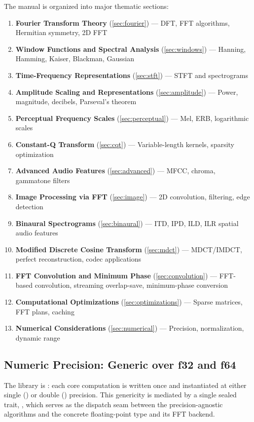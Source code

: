 The manual is organized into major thematic sections:
\begin{enumerate}[itemsep=3pt]
  \item \textbf{Fourier Transform Theory} (\cref{sec:fourier}) ---
    DFT, FFT algorithms, Hermitian symmetry, 2D FFT
  \item \textbf{Window Functions and Spectral Analysis}
    (\cref{sec:windows}) --- Hanning, Hamming, Kaiser, Blackman, Gaussian
  \item \textbf{Time-Frequency Representations} (\cref{sec:stft}) ---
    STFT and spectrograms
  \item \textbf{Amplitude Scaling and Representations} (\cref{sec:amplitude})
    --- Power, magnitude, decibels, Parseval's theorem
  \item \textbf{Perceptual Frequency Scales} (\cref{sec:perceptual})
    --- Mel, ERB, logarithmic scales
  \item \textbf{Constant-Q Transform} (\cref{sec:cqt}) --- Variable-length
    kernels, sparsity optimization
  \item \textbf{Advanced Audio Features} (\cref{sec:advanced}) ---
    MFCC, chroma, gammatone filters
  \item \textbf{Image Processing via FFT} (\cref{sec:image}) --- 2D
    convolution, filtering, edge detection
  \item \textbf{Binaural Spectrograms} (\cref{sec:binaural}) ---
    ITD, IPD, ILD, ILR spatial audio features
  \item \textbf{Modified Discrete Cosine Transform} (\cref{sec:mdct}) ---
    MDCT/IMDCT, perfect reconstruction, codec applications
  \item \textbf{FFT Convolution and Minimum Phase} (\cref{sec:convolution}) ---
    FFT-based convolution, streaming overlap-save, minimum-phase conversion
  \item \textbf{Computational Optimizations}
    (\cref{sec:optimizations}) --- Sparse matrices, FFT plans, caching
  \item \textbf{Numerical Considerations} (\cref{sec:numerical}) ---
    Precision, normalization, dynamic range
\end{enumerate}

\subsection{Numeric Precision: Generic over f32 and f64}\label{subsec:precision}

The library is : each core computation is
written once and instantiated at either single () or double
() precision. This genericity is mediated by a single sealed
trait, , which serves as the dispatch seam between the
precision-agnostic algorithms and the concrete floating-point type and
its FFT backend.

